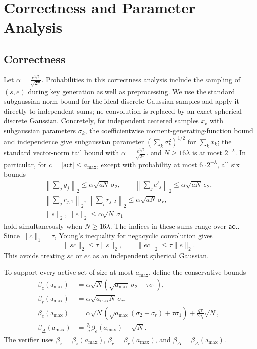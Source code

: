 \documentclass[lettersize,journal]{IEEEtran}
\begin{document}
\section{Correctness and Parameter Analysis}
\subsection{Correctness}
\label{app:correctness-details}
Let $
\alpha=\frac{e^{1/5}}{\sqrt{2\pi}}.$
Probabilities in this correctness analysis include the
sampling of $(s,e)$ during key generation as well as preprocessing.
We use the standard subgaussian norm bound for the ideal discrete-Gaussian
samples and apply it directly to independent sums; no convolution is replaced
by an exact spherical discrete Gaussian. {Concretely, for
independent centered samples $x_k$ with subgaussian parameters $\sigma_k$, the
coefficientwise moment-generating-function bound and independence give
subgaussian parameter $(\sum_k\sigma_k^2)^{1/2}$ for $\sum_kx_k$; the standard
vector-norm tail bound with
$\alpha=\frac{e^{1/5}}{\sqrt{2\pi}}.$ and $N\geq16\lambda$ is at most
$2^{-\lambda}$.} In particular, for
$a=|\mathsf{act}|\leq a_{\max}$, except with probability at most
$6\cdot2^{-\lambda}$, all six bounds
\[
\begin{gathered}
\left\|\sum_jy_j\right\|_2
\leq\alpha\sqrt{aN}\,\sigma_2,
\qquad
\left\|\sum_je'_j\right\|_2
\leq\alpha\sqrt{aN}\,\sigma_2,\\
\left\|\sum_jr_{j,1}\right\|_2,
\left\|\sum_jr_{j,2}\right\|_2
\leq\alpha\sqrt{aN}\,\sigma_r,\\
\|s\|_2,\|e\|_2
\leq\alpha\sqrt N\,\sigma_1
\end{gathered}
\]
hold simultaneously when $N\geq16\lambda$. The indices in these sums range over
$\mathsf{act}$. Since $\|c\|_1=\tau$, Young's inequality for negacyclic
convolution gives
\[
\|sc\|_2\leq\tau\|s\|_2,
\qquad
\|ec\|_2\leq\tau\|e\|_2.
\]
This avoids treating $sc$ or $ec$ as an independent spherical Gaussian.

To support every active set of size at most $a_{\max}$, define the conservative
bounds
\[
\begin{aligned}
\beta_z(a_{\max})
&=
\alpha\sqrt N
\left(\sqrt{a_{\max}}\,\sigma_2+\tau\sigma_1\right),\\
\beta_r(a_{\max})
&=
\alpha\sqrt{a_{\max}N}\,\sigma_r,\\
\beta_{\widetilde e}(a_{\max})
&=
\alpha\sqrt N
\left(
\sqrt{a_{\max}}(\sigma_2+\sigma_r)
+\tau\sigma_1
\right)
+\frac{q\tau}{2q_1}\sqrt N,\\
\beta_\Delta(a_{\max})
&=
\frac{q_2}{q}\beta_{\widetilde e}(a_{\max})+\sqrt N.
\end{aligned}
\]
The verifier uses
$\beta_z=\beta_z(a_{\max})$,
$\beta_r=\beta_r(a_{\max})$, and
$\beta_\Delta=\beta_\Delta(a_{\max})$.
\end{document}
